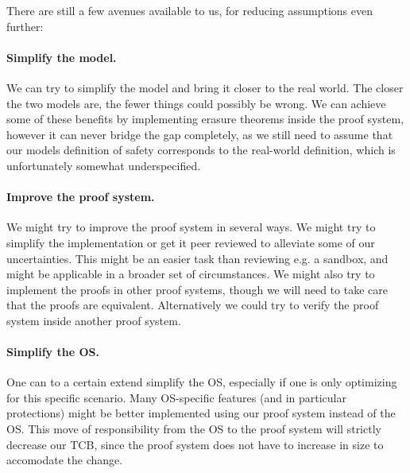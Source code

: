 There are still a few avenues available to us, for reducing assumptions even
further:

\paragraph{Simplify the model.} We can try to simplify the model and bring it
closer to the real world. The closer the two models are, the fewer things could
possibly be wrong. We can achieve some of these benefits by implementing erasure
theorems inside the proof system, however it can never bridge the gap
completely, as we still need to assume that our models definition of safety
corresponds to the real-world definition, which is unfortunately somewhat
underspecified.

\paragraph{Improve the proof system.} We might try to improve the proof system
in several ways. We might try to simplify the implementation or get it peer
reviewed to alleviate some of our uncertainties. This might be an easier task
than reviewing e.g. a sandbox, and might be applicable in a broader set of
circumstances. We might also try to implement the proofs in other proof systems,
though we will need to take care that the proofs are equivalent. Alternatively
we could try to verify the proof system inside another proof system.

\paragraph{Simplify the OS.} One can to a certain extend simplify the OS,
especially if one is only optimizing for this specific scenario. Many
OS-specific features (and in particular protections) might be better implemented
using our proof system instead of the OS. This move of responsibility from the
OS to the proof system will strictly decrease our TCB, since the proof system
does not have to increase in size to accomodate the change.
